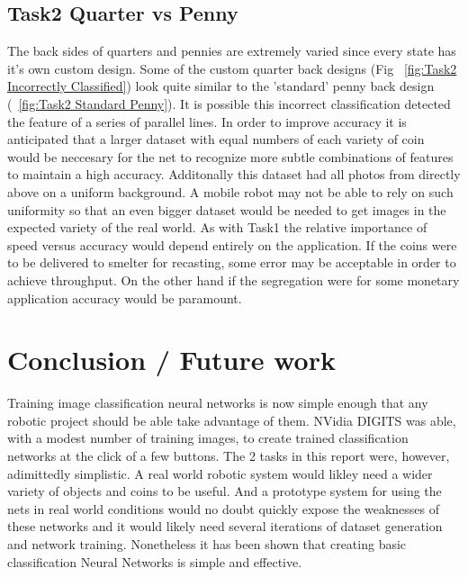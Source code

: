 \documentclass[10pt,journal,compsoc]{IEEEtran}
\begin{document}
\subsection{Task2 Quarter vs Penny}
The back sides of quarters and pennies are extremely varied since every state has it's own custom design. Some of the custom quarter back designs (Fig ~\ref{fig:Task2 Incorrectly Classified}) look quite similar to the 'standard' penny back design (~\ref{fig:Task2 Standard Penny}). It is possible this incorrect classification detected the feature of a series of parallel lines. In order to improve accuracy it is anticipated that a larger dataset with equal numbers of each variety of coin would be neccesary for the net to recognize more subtle combinations of features to maintain a high accuracy. Additonally this dataset had all photos from directly above on a uniform background. A mobile robot may not be able to rely on such uniformity so that an even bigger dataset would be needed to get images in the expected variety of the real world. As with Task1 the relative importance of speed versus accuracy would depend entirely on the application. If the coins were to be delivered to smelter for recasting, some error may be acceptable in order to achieve throughput. On the other hand if the segregation were for some monetary application accuracy would be paramount.

\section{Conclusion / Future work}
Training image classification neural networks is now simple enough that any robotic project should be able take advantage of them. NVidia DIGITS was able, with a modest number of training images, to create trained classification networks at the click of a few buttons. The 2 tasks in this report were, however, adimittedly simplistic. A real world robotic system would likley need a wider variety of objects and coins to be useful. And a prototype system for using the nets in real world conditions would no doubt quickly expose the weaknesses of these networks and it would likely need several iterations of dataset generation and network training. Nonetheless it has been shown that creating basic classification Neural Networks is simple and effective.
\end{document}
